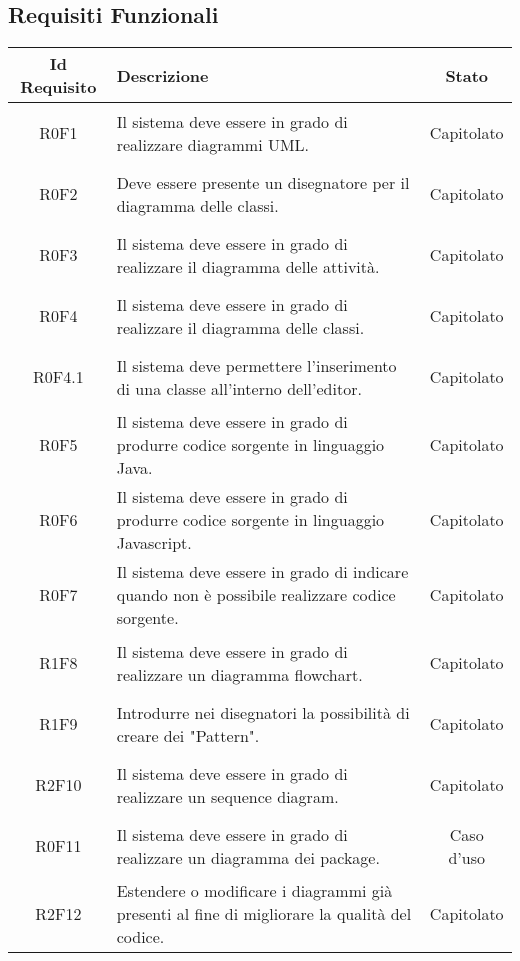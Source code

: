 \documentclass[../AnalisiDeiRequisiti.tex]{subfiles}
\begin{document}
\newpage
\subsection{Requisiti Funzionali}
\normalsize
\begin{longtable}{|c|>{\centering}p{7cm}|c|}
	\hline
	\textbf{Id Requisito} & \textbf{Descrizione} & \textbf{Stato}\\
	\hline
	\endhead
	\hypertarget{R0F1}{R0F1} & Il sistema deve essere in grado di realizzare diagrammi UML. & Capitolato \\ \hline
	\hypertarget{R0F2}{R0F2} & Deve essere presente un disegnatore per il diagramma delle classi. & Capitolato \\ \hline
	\hypertarget{R0F3}{R0F3} & Il sistema deve essere in grado di realizzare il diagramma delle attività. & Capitolato \\ \hline
	\hypertarget{R0F4}{R0F4} & Il sistema deve essere in grado di realizzare il diagramma delle classi. & Capitolato \\ \hline
	\hypertarget{R0F4.1}{R0F4.1} & Il sistema deve permettere l'inserimento di una classe all'interno dell'editor. & Capitolato \\ \hline
	\hypertarget{R0F5}{R0F5} & Il sistema deve essere in grado di produrre codice sorgente in linguaggio Java. & Capitolato \\ \hline
	\hypertarget{R0F6}{R0F6} & Il sistema deve essere in grado di produrre codice sorgente in linguaggio Javascript. & Capitolato \\ \hline
	\hypertarget{R0F7}{R0F7} & Il sistema deve essere in grado di indicare quando non è possibile realizzare codice sorgente. & Capitolato \\ \hline
	\hypertarget{R1F8}{R1F8} & Il sistema deve essere in grado di realizzare un diagramma flowchart. & Capitolato \\ \hline
	\hypertarget{R1F9}{R1F9} & Introdurre nei disegnatori la possibilità di creare dei "Pattern". & Capitolato \\ \hline
	\hypertarget{R2F10}{R2F10} & Il sistema deve essere in grado di realizzare un sequence diagram. & Capitolato \\ \hline
	\hypertarget{R0F11}{R0F11} & Il sistema deve essere in grado di realizzare un diagramma dei package. & Caso d'uso \\ \hline
	\hypertarget{R2F12}{R2F12} & Estendere o modificare i diagrammi già presenti al fine di migliorare la qualità del codice. & Capitolato \\ \hline

\end{longtable}
\end{document}
